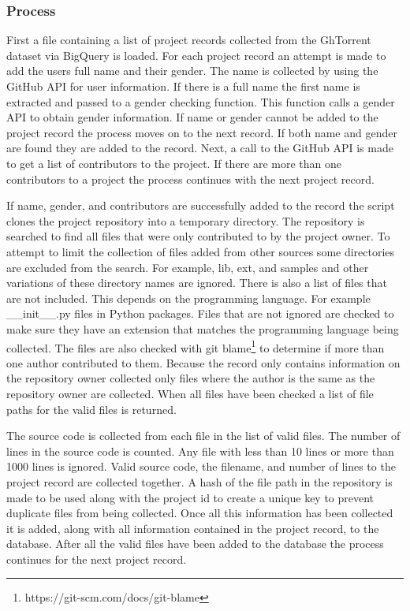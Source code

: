 \documentclass[12pt]{article}
\begin{document}
\subsubsection*{Process}
First a file containing a list of project records collected from the GhTorrent dataset via BigQuery is loaded. For each project record an attempt is made to add the users full name and their gender. The name is collected by using the GitHub API for user information. If there is a full name the first name is extracted and passed to a gender checking function. This function calls a gender API\cite{WEBSITE:GENDER1} to obtain gender information. If name or gender cannot be added to the project record the process moves on to the next record. If both name and gender are found they are added to the record. Next, a call to the GitHub API is made to get a list of contributors to the project. If there are more than one contributors to a project the process continues with the next project record.

If name, gender, and contributors are successfully added to the record the script clones the project repository into a temporary directory. The repository is searched to find all files that were only contributed to by the project owner. To attempt to limit the collection of files added from other sources some directories are excluded from the search. For example, lib, ext, and samples and other variations of these directory names are ignored\cite{Matyukhina2019}. There is also a list of files that are not included. This depends on the programming language. For example {\_\_}init{\_\_}.py files in Python packages. Files that are not ignored are checked to make sure they have an extension that matches the programming language being collected. The files are also checked with git blame\footnote{https://git-scm.com/docs/git-blame} to determine if more than one author contributed to them\cite{Wisse2015}. Because the record only contains information on the repository owner collected only files where the author is the same as the repository owner are collected. When all files have been checked a list of file paths for the valid files is returned.

The source code is collected from each file in the list of valid files. The number of lines in the source code is counted. Any file with less than 10 lines or more than 1000 lines is ignored. Valid source code, the filename, and number of lines to the project record are collected together. A hash of the file path in the repository is made to be used along with the project id to create a unique key to prevent duplicate files from being collected. Once all this information has been collected it is added, along with all information contained in the project record, to the database. After all the valid files have been added to the database the process continues for the next project record.
\end{document}
